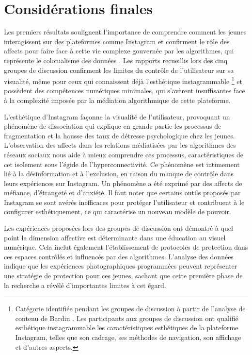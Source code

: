 \documentclass[final,fra]{anthology-ch}         %
\begin{document}
\section{Considérations finales}

Les premiers résultats soulignent l'importance de comprendre comment les jeunes interagissent sur des plateformes comme Instagram et confirment le rôle des affects pour faire face à cette vie complexe gouvernée par les algorithmes, qui représente le colonialisme des données \cite{couldry2019costs}. Les rapports recueillis lors des cinq groupes de discussion \cite{abreu2009grupos} confirment les limites du contrôle de l'utilisateur sur sa visualité, même pour ceux qui connaissent déjà l'esthétique \og instagrammable\fg{}%
\footnote{Catégorie identifiée pendant les groupes de discussion \cite{abreu2009grupos} à partir de l'analyse de contenu de Bardin \cite{bardin2008analise}. Les participants aux groupes de discussion \cite{abreu2009grupos} ont qualifié \og esthétique instagrammable\fg{} les caractéristiques esthétiques de la plateforme Instagram, telles que son cadrage, ses méthodes de navigation, son affichage et d'autres aspects.}
et possèdent des compétences numériques minimales, qui s'avèrent insuffisantes face à la complexité imposée par la médiation algorithmique de cette plateforme.

L'esthétique d'Instagram façonne la visualité de l'utilisateur, provoquant un phénomène de dissociation qui explique en grande partie les processus de fragmentation et la hausse des taux de détresse psychologique chez les jeunes. L'observation des affects dans les relations médiatisées par les algorithmes des réseaux sociaux nous aide à mieux comprendre ces processus, caractéristiques de cet isolement sous l'égide de l'hyperconnectivité. Ce phénomène est intimement lié à la désinformation et à l'exclusion, en raison du manque de contrôle dans leurs expériences sur Instagram. Un phénomène a été exprimé par des affects de méfiance, d'étrangeté et d'anxiété. Il faut noter que certains outils proposés par Instagram se sont avérés inefficaces pour protéger l'utilisateur et contribuent à le configurer esthétiquement, ce qui caractérise un nouveau modèle de pouvoir.

Les expériences proposées lors des groupes de discussion \cite{abreu2009grupos} ont démontré à quel point la dimension affective est déterminante dans une éducation au visuel numérique. Cela inclut également l'établissement de protocoles de protection dans ces espaces contrôlés et influencés par des algorithmes. L'analyse des données indique que les expériences photographiques programmées peuvent représenter une stratégie de protection pour ces jeunes, sachant que cette première phase de la recherche a révélé d'importantes limites à cet égard.
\end{document}
